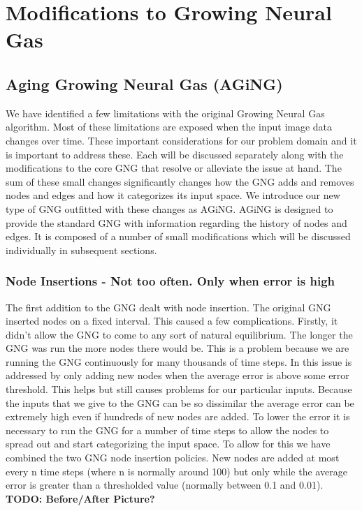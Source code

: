 \documentclass{article}
\renewcommand{\|}{\origbar} %
\begin{document}
\section{Modifications to Growing Neural Gas}
\label{sec:modificationsGNG}

\subsection{Aging Growing Neural Gas (AGiNG)}

We have identified a few limitations with the original Growing Neural Gas algorithm. Most of these limitations are exposed when the input image data changes over time. These important considerations for our problem domain and it is important to address these. Each will be discussed separately along with the modifications to the core GNG that resolve or alleviate the issue at hand. The sum of these small changes significantly changes how the GNG adds and removes nodes and edges and how it categorizes its input space. We introduce our new type of GNG outfitted with these changes as AGiNG. AGiNG is designed to provide the standard GNG with information regarding the history of nodes and edges. It is composed of a number of small modifications which will be discussed individually in subsequent sections.

\subsubsection{Node Insertions - Not too often. Only when error is high}

The first addition to the GNG dealt with node insertion. The original GNG inserted nodes on a fixed interval. This caused a few complications. Firstly, it didn't allow the GNG to come to any sort of natural equilibrium. The longer the GNG was run the more nodes there would be. This is a problem because we are running the GNG continuously for many thousands of time steps. In  this issue is addressed by only adding new nodes when the average error is above some error threshold. This helps but still causes problems for our particular inputs. Because the inputs that we give to the GNG can be so dissimilar the average error can be extremely high even if hundreds of new nodes are added. To lower the error it is necessary to run the GNG for a number of time steps to allow the nodes to spread out and start categorizing the input space. To allow for this we have combined the two GNG node insertion policies. New nodes are added at most every n time steps (where n is normally around 100) but only while the average error is greater than a thresholded value (normally between 0.1 and 0.01). {\bf TODO: Before/After Picture?}
\end{document}
